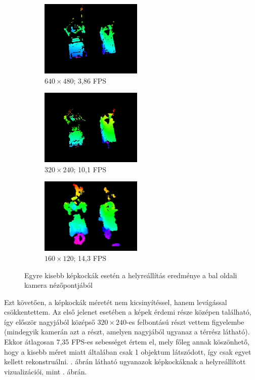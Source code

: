 \begin{figure}[tbh]
\centering
\begin{subfigure}[b]{.32\linewidth}
	\centering
	\includegraphics[width=137pt]{figures/vis_127_640.png}
	\caption{$640\times 480$; 3,86 FPS}
  \end{subfigure}
\begin{subfigure}[b]{.32\linewidth}
	\centering
	\includegraphics[width=137pt]{figures/vis_127_320.png}
	\caption{$320\times 240$; 10,1 FPS}
  \end{subfigure}
\begin{subfigure}[b]{.32\linewidth}
	\centering
	\includegraphics[width=137pt]{figures/vis_127_160.png}
	\caption{$160\times 120$; 14,3 FPS}
  \end{subfigure}
\caption{Egyre kisebb képkockák esetén a helyreállítás eredménye a bal oldali kamera nézőpontjából \label{fig:resize}}
\end{figure}

Ezt követően, a képkockák méretét nem kicsinyítéssel, hanem levágással csökkentettem. Az első jelenet esetében a képek érdemi része középen található, így először nagyjából középső $320\times 240$-es felbontású részt vettem figyelembe (mindegyik kamerán azt a részt, amelyen nagyjából ugyanaz a térrész látható). Ekkor átlagosan 7,35 FPS-es sebességet értem el, mely főleg annak köszönhető, hogy a kisebb méret miatt általában csak 1 objektum látszódott, így csak egyet kellett rekonstruálni. . ábrán látható ugyanazok képkockáknak a helyreállított vizualizációi, mint . ábrán.

